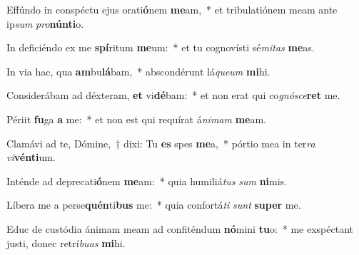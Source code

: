 \item Effúndo in conspéctu ejus orati\textbf{ó}nem \textbf{me}am,~* et tribulatiónem meam ante ip\textit{sum} \textit{pro}\textbf{nún}\textbf{ti}o.
\item In deficiéndo ex me \textbf{spí}ritum \textbf{me}um:~* et tu cognovísti sé\textit{mi}\textit{tas} \textbf{me}as.
\item In via hac, qua \textbf{am}bu\textbf{lá}bam,~* abscondérunt lá\textit{que}\textit{um} \textbf{mi}hi.
\item Considerábam ad déxteram, \textbf{et} vi\textbf{dé}bam:~* et non erat qui co\textit{gnó}\textit{sce}\textbf{ret} me.
\item Périit \textbf{fu}ga \textbf{a} me:~* et non est qui requírat á\textit{ni}\textit{mam} \textbf{me}am.
\item Clamávi ad te, Dómine,~† dixi: Tu \textbf{es} spes \textbf{me}a,~* pórtio mea in ter\textit{ra} \textit{vi}\textbf{vén}\textbf{ti}um.
\item Inténde ad deprecati\textbf{ó}nem \textbf{me}am:~* quia humiliá\textit{tus} \textit{sum} \textbf{ni}mis.
\item Líbera me a perse\textbf{quén}ti\textbf{bus} me:~* quia confortá\textit{ti} \textit{sunt} \textbf{su}\textbf{per} me.
\item Educ de custódia ánimam meam ad confiténdum \textbf{nó}mini \textbf{tu}o:~* me exspéctant justi, donec retrí\textit{bu}\textit{as} \textbf{mi}hi.
